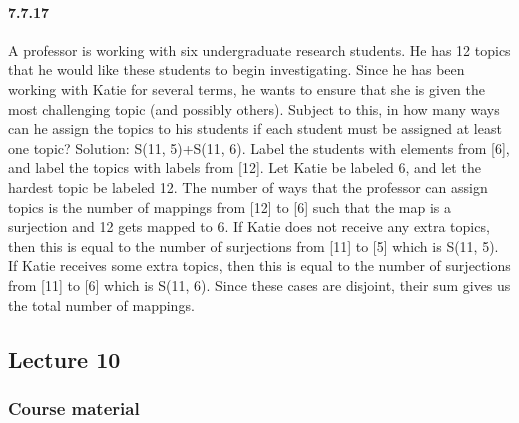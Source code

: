 \documentclass{article}
\begin{document}
\paragraph{7.7.17}
A professor is working with six undergraduate research students. He has 12 topics
that he would like these students to begin investigating. Since he has been working
with Katie for several terms, he wants to ensure that she is given the most challenging
topic (and possibly others). Subject to this, in how many ways can he assign the topics
to his students if each student must be assigned at least one topic?\newline
Solution:\newline
S(11, 5)+S(11, 6). Label the students with elements from [6], and label the topics with labels
from [12]. Let Katie be labeled 6, and let the hardest topic be labeled 12. The number of ways
that the professor can assign topics is the number of mappings from [12] to [6] such that the
map is a surjection and 12 gets mapped to 6. If Katie does not receive any extra topics, then
this is equal to the number of surjections from [11] to [5] which is S(11, 5). If Katie receives
some extra topics, then this is equal to the number of surjections from [11] to [6] which is
S(11, 6). Since these cases are disjoint, their sum gives us the total number of mappings.
\subsection{Lecture 10}
\subsubsection{Course material}
\end{document}
